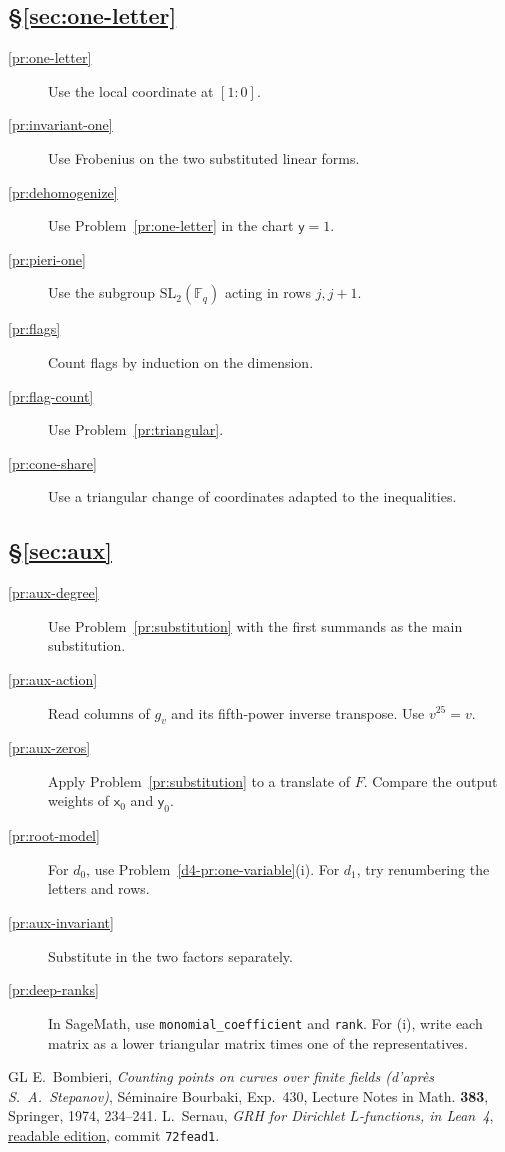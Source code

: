 \documentclass[reqno]{amsart}
\theoremstyle{plain}
\theoremstyle{definition}
\theoremstyle{remark}
\newcommand{\F}{\mathbb{F}}
\newcommand{\SL}{\mathrm{SL}}
\newcommand{\xv}{\mathsf{x}}
\newcommand{\yv}{\mathsf{y}}
\newcommand{\tl}[1]{\texttt{#1}}
\begin{document}
\subsection*{\S\ref{sec:one-letter}}
\begin{description}
\item[\ref{pr:one-letter}] Use the local coordinate at \([1:0]\).
\item[\ref{pr:invariant-one}] Use Frobenius on the two substituted linear forms.
\item[\ref{pr:dehomogenize}] Use Problem~\ref{pr:one-letter} in the chart \(\yv=1\).
\item[\ref{pr:pieri-one}] Use the subgroup \(\SL_2(\F_q)\) acting in rows \(j,j+1\).
\item[\ref{pr:flags}] Count flags by induction on the dimension.
\item[\ref{pr:flag-count}] Use Problem~\ref{pr:triangular}.
\item[\ref{pr:cone-share}] Use a triangular change of coordinates adapted to the inequalities.
\end{description}

\subsection*{\S\ref{sec:aux}}
\begin{description}
\item[\ref{pr:aux-degree}] Use Problem~\ref{pr:substitution} with the first summands as the main substitution.
\item[\ref{pr:aux-action}] Read columns of \(g_v\) and its fifth-power inverse transpose.  Use \(v^{25}=v\).
\item[\ref{pr:aux-zeros}] Apply Problem~\ref{pr:substitution} to a translate of \(F\).  Compare the output weights of \(\xv_0\) and \(\yv_0\).
\item[\ref{pr:root-model}] For \(d_0\), use Problem~\ref{d4-pr:one-variable}(i).  For \(d_1\), try renumbering the letters and rows.
\item[\ref{pr:aux-invariant}] Substitute in the two factors separately.
\item[\ref{pr:deep-ranks}] In SageMath, use \tl{monomial\_coefficient} and \tl{rank}.  For (i), write each matrix as a lower triangular matrix times one of the representatives.
\end{description}

\begin{thebibliography}{GL}
 E.~Bombieri, \emph{Counting points on curves over finite fields (d'apr\`es S.~A.~Stepanov)}, S\'eminaire Bourbaki, Exp.~430, Lecture Notes in Math. \textbf{383}, Springer, 1974, 234--241.
 L.~Sernau, \emph{GRH for Dirichlet \(L\)-functions, in Lean~4}, \href{https://github.com/lsernau/grh-lean/tree/72fead102f663d5c7a407964a13dc0cf9d977207/grh}{readable edition}, commit \texttt{72fead1}.
\end{thebibliography}
\end{document}
